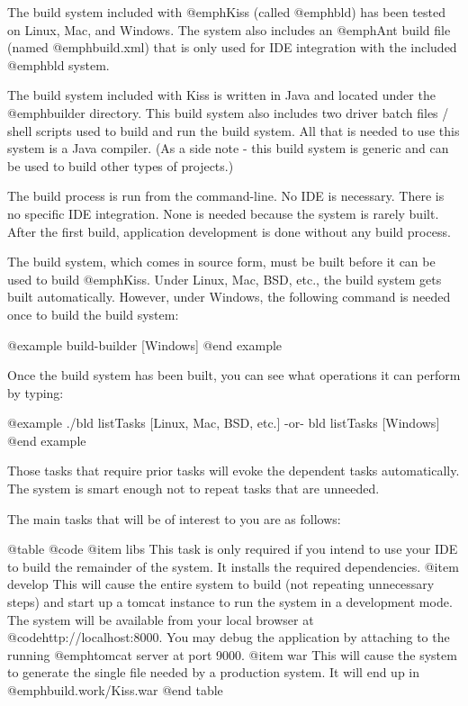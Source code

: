 The build system included with @emph{Kiss} (called @emph{bld}) has
been tested on Linux, Mac, and Windows.  The system also includes an
@emph{Ant} build file (named @emph{build.xml}) that is only used for
IDE integration with the included @emph{bld} system.

The build system included with Kiss is written in Java and located
under the @emph{builder} directory.  This build system also includes
two driver batch files / shell scripts used to build and run the build
system.  All that is needed to use this system is a Java compiler.
(As a side note - this build system is generic and can be used to
build other types of projects.)

The build process is run from the command-line.  No IDE is necessary.
There is no specific IDE integration.  None is needed because the system
is rarely built.  After the first build, application development is done
without any build process.

The build system, which comes in source form, must be built before it
can be used to build @emph{Kiss}.  Under Linux, Mac, BSD, etc., the
build system gets built automatically.  However, under Windows, the 
following command is needed once to build the build system:

@example
    build-builder             [Windows]
@end example

Once the build system has been built, you can see what operations it
can perform by typing:

@example
    ./bld listTasks           [Linux, Mac, BSD, etc.]
        -or-
    bld listTasks             [Windows]
@end example

Those tasks that require prior tasks will evoke the dependent tasks
automatically.  The system is smart enough not to repeat tasks that
are unneeded.

The main tasks that will be of interest to you are as follows:

@table @code
@item libs
This task is only required if you intend to use your IDE to build the
remainder of the system.  It installs the required dependencies.
@item develop
This will cause the entire system to build (not repeating unnecessary
steps) and start up a tomcat instance to run the system in a
development mode.  The system will be available from your local
browser at @code{http://localhost:8000}.  You may debug the
application by attaching to the running @emph{tomcat} server at port
9000.
@item war
This will cause the system to generate the single file needed by a
production system.  It will end up in @emph{build.work/Kiss.war}
@end table

